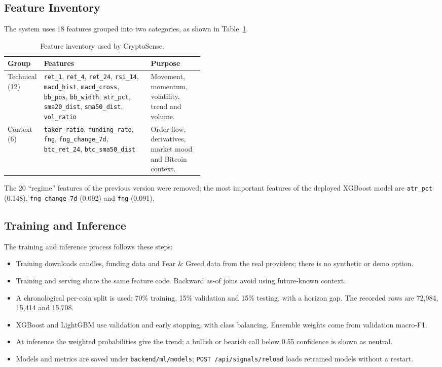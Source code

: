 \subsection{Feature Inventory}
The system uses 18 features grouped into two categories, as shown in Table~\ref{tab:features}.
\begin{table}[H]\centering
\renewcommand{\arraystretch}{1.3}
\begin{tabularx}{\linewidth}{|p{0.18\linewidth}|X|p{0.27\linewidth}|}\hline
\textbf{Group} & \textbf{Features} & \textbf{Purpose}\\\hline
Technical (12) & \texttt{ret\_1}, \texttt{ret\_4}, \texttt{ret\_24}, \texttt{rsi\_14}, \texttt{macd\_hist}, \texttt{macd\_cross}, \texttt{bb\_pos}, \texttt{bb\_width}, \texttt{atr\_pct}, \texttt{sma20\_dist}, \texttt{sma50\_dist}, \texttt{vol\_ratio} & Movement, momentum, volatility, trend and volume.\\\hline
Context (6) & \texttt{taker\_ratio}, \texttt{funding\_rate}, \texttt{fng}, \texttt{fng\_change\_7d}, \texttt{btc\_ret\_24}, \texttt{btc\_sma50\_dist} & Order flow, derivatives, market mood and Bitcoin context.\\\hline
\end{tabularx}
\caption{Feature inventory used by CryptoSense.}\label{tab:features}
\end{table}
The 20 ``regime'' features of the previous version were removed; the most important features of the deployed XGBoost model are \texttt{atr\_pct} (0.148), \texttt{fng\_change\_7d} (0.092) and \texttt{fng} (0.091).

\subsection{Training and Inference}
The training and inference process follows these steps:
\begin{itemize}
\item Training downloads candles, funding data and Fear \& Greed data from the real providers; there is no synthetic or demo option.
\item Training and serving share the same feature code. Backward as-of joins avoid using future-known context.
\item A chronological per-coin split is used: 70\% training, 15\% validation and 15\% testing, with a horizon gap. The recorded rows are 72{,}984, 15{,}414 and 15{,}708.
\item XGBoost and LightGBM use validation and early stopping, with class balancing. Ensemble weights come from validation macro-F1.
\item At inference the weighted probabilities give the trend; a bullish or bearish call below 0.55 confidence is shown as neutral.
\item Models and metrics are saved under \texttt{backend/ml/models}; \texttt{POST /api/signals/reload} loads retrained models without a restart.
\end{itemize}

